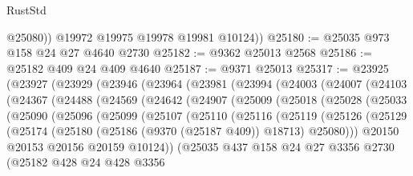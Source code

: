 \begin{lexlean}{RustStd}
\begin{coremodule}
            @25080))
        @19972
        @19975
        @19978
        @19981
        @10124))
@25180 := @25035 @973 @158 @24 @27 @4640 @2730
@25182 := @9362 @25013 @2568
@25186 := @25182 @409 @24 @409 @4640
@25187 := @9371 @25013
@25317 := @23925
    (@23927
      (@23929
        (@23946
          (@23964
            (@23981
              (@23994
                (@24003
                  (@24007
                    (@24103
                      (@24367
                        (@24488
                          (@24569
                            (@24642
                              (@24907
                                (@25009
                                  (@25018
                                    (@25028
                                      (@25033
                                        (@25090
                                          (@25096
                                            (@25099
                                              (@25107
                                                (@25110
                                                  (@25116
                                                    (@25119
                                                      (@25126
                                                        (@25129
                                                          (@25174
                                                            (@25180
                                                              (@25186 (@9370 (@25187 @409)) @18713)
                                                              @25080)))
                                                        @20150
                                                        @20153
                                                        @20156
                                                        @20159
                                                        @10124))
                                                    (@25035
                                                      @437
                                                      @158
                                                      @24
                                                      @27
                                                      @3356
                                                      @2730
                                                      (@25182
                                                        @428
                                                        @24
                                                        @428
                                                        @3356

\end{coremodule}
\end{lexlean}
